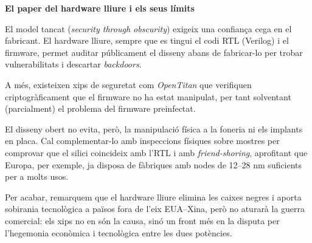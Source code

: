 \documentclass[catalan, a4paper]{article}
\begin{document}
\textbf{El paper del hardware lliure i els seus límits}

El model tancat (\textit{security through obscurity}) exigeix una confiança cega en el fabricant.
El hardware lliure, sempre que es tingui el codi RTL (Verilog) i el firmware, permet auditar públicament el disseny
abans de fabricar-lo per trobar vulnerabilitats i descartar \textit{backdoors}.

A més, existeixen xips de seguretat com \textit{OpenTitan} que verifiquen criptogràficament
que el firmware no ha estat manipulat, per tant solventant (parcialment) el problema del
firmware preinfectat.

El disseny obert no evita, però, la manipulació física a la foneria ni els implants en placa.
Cal complementar-lo amb inspeccions físiques sobre mostres per comprovar que el silici coincideix
amb l'RTL i amb \textit{friend-shoring}, aprofitant que Europa, per exemple, ja disposa de fàbriques amb nodes
de 12--28 nm suficients per a molts usos.

Per acabar, remarquem que el hardware lliure elimina les caixes negres i aporta sobirania
tecnològica a països fora de l'eix EUA--Xina, però no aturarà la guerra comercial: els xips
no en són la causa, sinó un front més en la disputa per l'hegemonia econòmica i tecnològica entre les dues potències.
\clearpage
\end{document}
